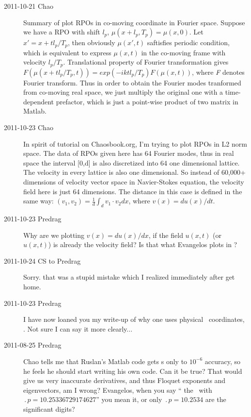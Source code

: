 \begin{description}
\item[2011-10-21 Chao] Summary of plot RPOs in co-moving coordinate in Fourier space.
Suppose we have a RPO with shift $\textit{$l_p$}$, $\mu(x+\textit{$l_p$},\textit{$T_p$})=\mu(x,0)$. Let $x'=x+t\textit{$l_p$}/\textit{$T_p$}$, then obviously $\mu(x',t)$ saftisfies periodic condition, which is equivalent to express $\mu(x,t)$ in the co-moving frame with velocity $\textit{$l_p$}/\textit{$T_p$}$.  Translational property of Fourier transformation gives $\textit{F}(\mu(x+t\textit{$l_p$}/\textit{$T_p$},\textit{t})) = exp(-ikt\textit{$l_p$}/\textit{$T_p$})\textit{F}(\mu(x,t))$, where \textit{F} denotes Fourier transform. Thus in order to obtain the Fourier modes tranformed from co-moving real space, we just multiply the original one with a time-dependent prefactor, which is just a point-wise product of two matrix in Matlab.

\item[2011-10-23 Chao] In spirit of tutorial on Chaosbook.org, I'm trying
to plot RPOs in L2 norm space. The data of RPOs given here has 64 Fourier
modes, thus in real space the interval [0,d] is also discretized into 64
one dimensional lattice. The velocity in every lattice is also one
dimensional. So instead of 60,000+ dimensions of velocity vector space in
Navier-Stokes equation, the velocity field here is just 64 dimensions.
The distance in this case is defined in the same way: $(v_1,v_2) =
\frac{1}{d}\int_d{v_1}\cdot{v_2}dx$, where $v(x)=du(x)/dt$.

\item[2011-10-23 Predrag]
Why are we plotting $v(x)=du(x)/dx$,
if the field $u(x,t)$ (or $u(x,t)$) is already the velocity field?
Is that what Evangelos plots in ?

\item[2011-10-24 CS to Predrag]
Sorry. that was a stupid mistake which I realized immediately after get home.

\item[2011-10-23 Predrag]
I have now loaned you my write-up of why one uses physical \statesp\
coordinates, . Not sure I can say it more
clearly...

\item[2011-08-25 Predrag] Chao tells me that Ruslan's Matlab code gets
\rpo s only to $10^{-6}$ accuracy, so he feels he should start writing
his own code. Can it be true? That would give us very inaccurate
derivatives, and thus Floquet exponents and eigenvectors, am I wrong?
Evangelos, when you say ``\PO{10.25} the \po\ with
$\period{p}=10.25336729174627$'' you mean it, or only
$\period{p}=10.2534$ are the significant digits?


\end{description}

